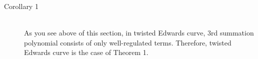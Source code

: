 \begin{description}
  \item [Corollary 1]~\\
    As you see above of this section, 
    in twisted Edwards curve, 3rd summation polynomial consists of
    only well-regulated terms.
    Therefore, twisted Edwards curve is the case of Theorem 1.
\end{description}



